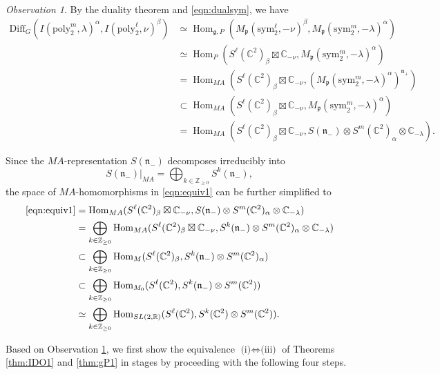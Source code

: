 \documentclass[reqno,11pt]{amsart}
\theoremstyle{remark}
\newtheorem{obs}[equation]{Observation}
\numberwithin{equation}{section}
\newcommand{\gb}{\beta}
\newcommand{\ga}{\alpha}
\newcommand{\fg}{{\mathfrak g}}
\newcommand{\fn}{{\mathfrak n}}
\newcommand{\fp}{{\mathfrak p}}
\newcommand{\R}{\mathbb{R}}
\newcommand{\C}{\mathbb{C}}
\newcommand{\Z}{\mathbb{Z}}
\newcommand{\Hom}{\operatorname{Hom}}
\newcommand{\poly}{\mathrm{poly}}
\newcommand{\Diff}{\mathrm{Diff}}
\newcommand{\sym}{\mathrm{sym}}
\begin{document}
\begin{obs}\label{obs:41}
By the duality theorem and \eqref{eqn:dualsym}, we have 
\begin{align}\label{eqn:equiv1}
\Diff_G(I(\poly_2^m, \lambda)^\ga, I(\poly_2^\ell,  \nu)^\beta)
&\simeq
\Hom_{\fg, P}(M_\fp(\sym_2^\ell,-\nu)^\gb, M_\fp(\sym_2^m, -\lambda)^\ga) \nonumber\\
&\simeq
\Hom_{P}(S^\ell(\C^2)_\beta\boxtimes \C_{-\nu}, M_\fp(\sym_2^m, -\lambda)^\alpha)
\nonumber\\
&=
\Hom_{MA}(S^\ell(\C^2)_\beta\boxtimes \C_{-\nu}, 
\left(M_\fp(\sym_2^m, -\lambda)^\alpha\right)^{\fn_+})\nonumber\\
&\subset
\Hom_{MA}(S^\ell(\C^2)_\beta\boxtimes \C_{-\nu}, M_\fp(\sym_2^m, -\lambda)^\alpha)
\nonumber\\
&=
\Hom_{MA}(S^\ell(\C^2)_\beta\boxtimes \C_{-\nu}, 
S(\fn_-)\otimes S^m(\C^2)_\alpha\otimes \C_{-\lambda}).
\end{align}

\noindent
Since the $MA$-representation $S(\fn_-)$ decomposes irreducibly into
\begin{equation*}
S(\fn_-)\vert_{MA} = \bigoplus_{k\in \Z_{\geq 0}}S^k(\fn_-),
\end{equation*}
the space of $MA$-homomorphisms in \eqref{eqn:equiv1}
can be further simplified to
\begin{align*}
\eqref{eqn:equiv1}
&=
\Hom_{MA}(S^\ell(\C^2)_\beta\boxtimes \C_{-\nu}, 
S(\fn_-)\otimes S^m(\C^2)_\alpha\otimes \C_{-\lambda})\\
&=
\bigoplus_{k \in \Z_{\geq 0}}
\Hom_{MA}(S^\ell(\C^2)_\beta\boxtimes \C_{-\nu}, 
S^k(\fn_-)\otimes S^m(\C^2)_\alpha\otimes \C_{-\lambda})\\
&\subset
\bigoplus_{k \in \Z_{\geq 0}}
\Hom_{M}(S^\ell(\C^2)_\beta, S^k(\fn_-)\otimes S^m(\C^2)_\alpha)\\
&\subset
\bigoplus_{k \in \Z_{\geq 0}}
\Hom_{M_0}(S^\ell(\C^2), S^k(\fn_-)\otimes S^m(\C^2))\\
&\simeq
\bigoplus_{k \in \Z_{\geq 0}}
\Hom_{SL(2,\R)}(S^\ell(\C^2), S^k(\C^2)\otimes S^m(\C^2)).
\end{align*}
\end{obs}

Based on Observation \ref{obs:41},
we first show the equivalence $\text{(i)}\Leftrightarrow \text{(iii)}$ 
of Theorems \ref{thm:IDO1} and \ref{thm:gP1}
in stages by proceeding with the following four steps.

\vskip 0.1in
\end{document}
